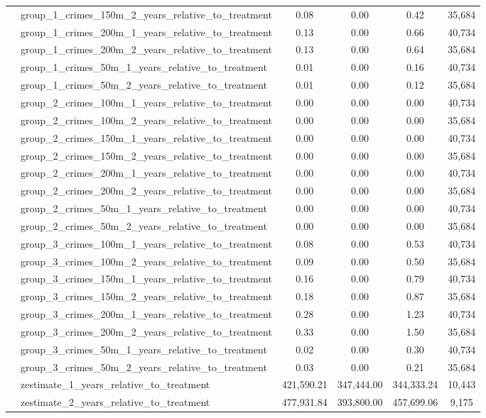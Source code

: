 \begin{tabular}{llcccc}
 & group_1_crimes_150m_2_years_relative_to_treatment & 0.08 & 0.00 & 0.42 & 35,684 \\
 & group_1_crimes_200m_1_years_relative_to_treatment & 0.13 & 0.00 & 0.66 & 40,734 \\
 & group_1_crimes_200m_2_years_relative_to_treatment & 0.13 & 0.00 & 0.64 & 35,684 \\
 & group_1_crimes_50m_1_years_relative_to_treatment & 0.01 & 0.00 & 0.16 & 40,734 \\
 & group_1_crimes_50m_2_years_relative_to_treatment & 0.01 & 0.00 & 0.12 & 35,684 \\
 & group_2_crimes_100m_1_years_relative_to_treatment & 0.00 & 0.00 & 0.00 & 40,734 \\
 & group_2_crimes_100m_2_years_relative_to_treatment & 0.00 & 0.00 & 0.00 & 35,684 \\
 & group_2_crimes_150m_1_years_relative_to_treatment & 0.00 & 0.00 & 0.00 & 40,734 \\
 & group_2_crimes_150m_2_years_relative_to_treatment & 0.00 & 0.00 & 0.00 & 35,684 \\
 & group_2_crimes_200m_1_years_relative_to_treatment & 0.00 & 0.00 & 0.00 & 40,734 \\
 & group_2_crimes_200m_2_years_relative_to_treatment & 0.00 & 0.00 & 0.00 & 35,684 \\
 & group_2_crimes_50m_1_years_relative_to_treatment & 0.00 & 0.00 & 0.00 & 40,734 \\
 & group_2_crimes_50m_2_years_relative_to_treatment & 0.00 & 0.00 & 0.00 & 35,684 \\
 & group_3_crimes_100m_1_years_relative_to_treatment & 0.08 & 0.00 & 0.53 & 40,734 \\
 & group_3_crimes_100m_2_years_relative_to_treatment & 0.09 & 0.00 & 0.50 & 35,684 \\
 & group_3_crimes_150m_1_years_relative_to_treatment & 0.16 & 0.00 & 0.79 & 40,734 \\
 & group_3_crimes_150m_2_years_relative_to_treatment & 0.18 & 0.00 & 0.87 & 35,684 \\
 & group_3_crimes_200m_1_years_relative_to_treatment & 0.28 & 0.00 & 1.23 & 40,734 \\
 & group_3_crimes_200m_2_years_relative_to_treatment & 0.33 & 0.00 & 1.50 & 35,684 \\
 & group_3_crimes_50m_1_years_relative_to_treatment & 0.02 & 0.00 & 0.30 & 40,734 \\
 & group_3_crimes_50m_2_years_relative_to_treatment & 0.03 & 0.00 & 0.21 & 35,684 \\
 & zestimate_1_years_relative_to_treatment & 421,590.21 & 347,444.00 & 344,333.24 & 10,443 \\
 & zestimate_2_years_relative_to_treatment & 477,931.84 & 393,800.00 & 457,699.06 & 9,175 \\
\cline{1-6}
\bottomrule
\end{tabular}
